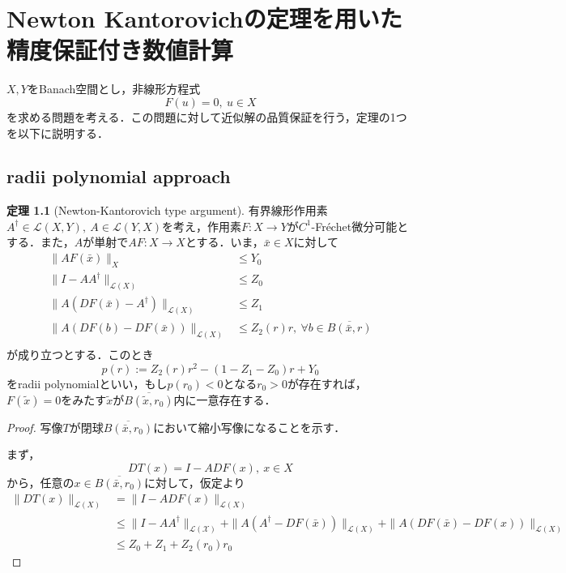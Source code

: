 \documentclass[11pt,a4paper,titlepage]{jsreport}
\theoremstyle{definition}
\newtheorem{thm}{定理}
\begin{document}
\chapter{Newton Kantorovichの定理を用いた精度保証付き数値計算}
$X,Y$をBanach空間とし，非線形方程式
\begin{equation*}
  F(u)=0,\ u\in X
\end{equation*}
を求める問題を考える．この問題に対して近似解の品質保証を行う，定理の1つを以下に説明する．

\section{radii polynomial approach \cite{github}}
\begin{thm}[Newton-Kantorovich type argument]
  有界線形作用素$A^\dagger \in \mathcal{L}(X,Y),\ A\in \mathcal{L}(Y,X)$を考え，作用素$F:X\rightarrow Y$が$C^1$-Fr\'{e}chet微分可能とする．また，$A$が単射で$AF:X\rightarrow X$とする．いま，$\bar{x} \in X$に対して%
  \begin{align*}
    \|AF(\bar{x})\|_X                             & \leq Y_0                                             \\
    \|I-AA^\dagger\|_{\mathcal{L}(X)}              & \leq Z_0                                             \\
    \|A(DF(\bar{x})-A^\dagger)\|_{\mathcal{L}(X)} & \leq Z_1                                             \\
    \|A(DF(b)-DF(\bar{x}))\|_{\mathcal{L}(X)}       & \leq Z_2(r)r,\ \forall b \in \overline{B(\bar{x},r)} \\
  \end{align*}
  が成り立つとする．このとき
  \begin{equation*}
    p(r) := Z_2(r)r^2 - (1-Z_1-Z_0)r+Y_0
  \end{equation*}
  をradii polynomialといい，もし$p(r_0)<0$となる$r_0>0$が存在すれば，$F(\tilde{x})=0$をみたす$\tilde{x}$が$\overline{B(\tilde{x},r_0)}$内に一意存在する．
\end{thm}

\begin{proof}
  写像$T$が閉球$\overline{B(\bar{x},r_0)}$において縮小写像になることを示す．

  まず，
  \begin{equation*}
    DT(x)=I-ADF(x),\ x\in X
  \end{equation*}
  から，任意の$x\in \overline{B(\bar{x},r_0)}$に対して，仮定より
  \begin{align*}
    \|DT(x)\|_{\mathcal{L}(X)} & = \|I-ADF(x)\|_{\mathcal{L}(X)}                                                                                                  \\
                               & \leq \|I-AA^\dagger\|_\mathcal{L(X)} + \|A(A^\dagger-DF(\bar{x}))\|_{\mathcal{L}(X)} + \|A(DF(\bar{x})-DF(x))\|_{\mathcal{L}(X)} \\
                               & \leq Z_0 + Z_1 + Z_2(r_0)r_0
  \end{align*}
\end{proof}
\end{document}
